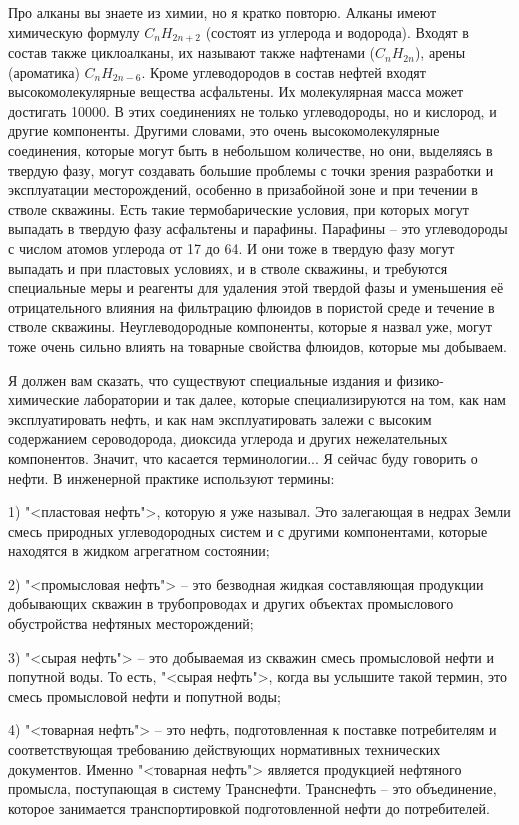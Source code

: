 \documentclass[main.tex]{subfiles}
\begin{document}
Про алканы вы знаете из химии, но я кратко повторю.
Алканы имеют химическую формулу $C_nH_{2n+2}$ (состоят из углерода и водорода).
Входят в состав также циклоалканы, их называют также нафтенами ($C_nH_{2n}$), арены (ароматика) $C_nH_{2n-6}$.
Кроме углеводородов в состав нефтей входят высокомолекулярные вещества асфальтены.
Их молекулярная масса может достигать 10000.
В этих соединениях не только углеводороды, но и кислород, и другие компоненты.
Другими словами, это очень высокомолекулярные соединения, которые могут быть в небольшом количестве, но они, выделяясь в твердую фазу, могут создавать большие проблемы с точки зрения разработки и эксплуатации месторождений, особенно в призабойной зоне и при течении в стволе скважины.
Есть такие термобарические условия, при которых могут выпадать в твердую фазу асфальтены и парафины.
Парафины -- это углеводороды с числом атомов углерода от 17 до 64.
И они тоже в твердую фазу могут выпадать и при пластовых условиях, и в стволе скважины, и требуются специальные меры и реагенты для удаления этой твердой фазы и уменьшения её отрицательного влияния на фильтрацию флюидов в пористой среде и течение в стволе скважины.
Неуглеводородные компоненты, которые я назвал уже, могут тоже очень сильно влиять на товарные свойства флюидов, которые мы добываем.

Я должен вам сказать, что существуют специальные издания и физико-химические лаборатории и так далее, которые специализируются на том, как нам эксплуатировать нефть, и как нам эксплуатировать залежи с высоким содержанием сероводорода, диоксида углерода и других нежелательных компонентов.
Значит, что касается терминологии...
Я сейчас буду говорить о нефти.
В инженерной практике используют термины:

1) "<пластовая нефть">, которую я уже называл.
Это залегающая в недрах Земли смесь природных углеводородных систем и с другими компонентами, которые находятся в жидком агрегатном состоянии;

2) "<промысловая нефть"> -- это безводная жидкая составляющая продукции добывающих скважин в трубопроводах и других объектах промыслового обустройства нефтяных месторождений;

3) "<сырая нефть"> -- это добываемая из скважин смесь промысловой нефти и попутной воды.
То есть, "<сырая нефть">, когда вы услышите такой термин, это смесь промысловой нефти и попутной воды;

4) "<товарная нефть"> -- это нефть, подготовленная к поставке потребителям и соответствующая требованию действующих нормативных технических документов.
Именно "<товарная нефть"> является продукцией нефтяного промысла, поступающая в систему Транснефти.
Транснефть -- это объединение, которое занимается транспортировкой подготовленной нефти до потребителей.
\end{document}
